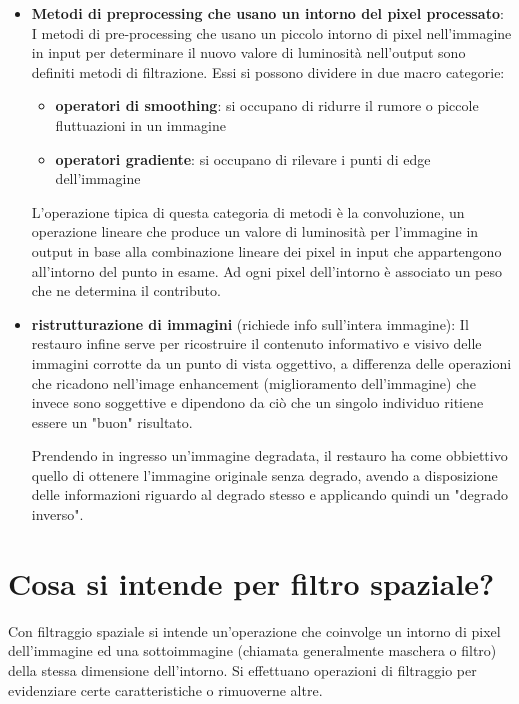 \begin{itemize}
	\item \textbf{Metodi di preprocessing che usano un intorno del pixel processato}: I metodi di pre-processing che usano un piccolo intorno di pixel nell'immagine in input per determinare il nuovo valore di luminosità nell'output sono definiti metodi di filtrazione. Essi si possono dividere in due macro categorie:
	\begin{itemize}
		\item \textbf{operatori di smoothing}: si occupano di ridurre il rumore o piccole fluttuazioni in un immagine
		
		\item \textbf{operatori gradiente}: si occupano di rilevare i punti di edge dell'immagine
	\end{itemize}
	
	L'operazione tipica di questa categoria di metodi è la convoluzione, un operazione lineare che produce un valore di luminosità per l'immagine in output in base alla combinazione lineare dei pixel in input che appartengono all'intorno del punto in esame. Ad ogni pixel dell'intorno è associato un peso che ne determina il contributo.
	
	\item \textbf{ristrutturazione di immagini} (richiede info sull'intera immagine): Il restauro infine serve per ricostruire il contenuto informativo e visivo delle immagini corrotte da un punto di vista	oggettivo, a differenza delle operazioni che ricadono nell'image enhancement (miglioramento dell'immagine) che invece sono soggettive e dipendono da ciò che un singolo individuo ritiene essere un "buon" risultato.
	
	Prendendo in ingresso un'immagine degradata, il restauro ha come obbiettivo quello di ottenere l'immagine originale senza degrado, avendo a disposizione delle informazioni riguardo al degrado stesso e applicando quindi un "degrado inverso".
\end{itemize}

\section{Cosa si intende per filtro spaziale?}
Con filtraggio spaziale si intende un'operazione che coinvolge un intorno di pixel dell'immagine ed una sottoimmagine (chiamata generalmente maschera o filtro) della stessa dimensione dell'intorno. Si effettuano operazioni di filtraggio per evidenziare certe caratteristiche o rimuoverne altre.

